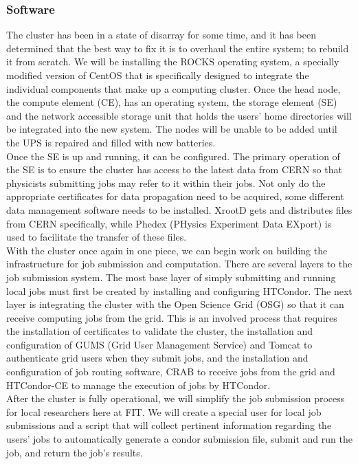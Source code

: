 \documentclass[12pt]{article}
\newcommand\tab[1][1cm]{\hspace*{#1}}
\begin{document}
\subsubsection*{Software}
%
\tab The cluster has been in a state of disarray for some time, and it has been determined that the best way to fix it is to overhaul the entire system; to rebuild it from scratch. We will be installing the ROCKS operating system, a specially modified version of CentOS that is specifically designed to integrate the individual components that make up a computing cluster. Once the head node, the compute element (CE), has an operating system, the storage element (SE) and the network accessible storage unit that holds the users’ home directories will be integrated into the new system. The nodes will be unable to be added until the UPS is repaired and filled with new batteries. \\
\tab Once the SE is up and running, it can be configured. The primary operation of the SE is to ensure the cluster has access to the latest data from CERN so that physicists submitting jobs may refer to it within their jobs. Not only do the appropriate certificates for data propagation need to be acquired, some different data management software needs to be installed. XrootD gets and distributes files from CERN specifically, while Phedex (PHysics Experiment Data EXport) is used to facilitate the transfer of these files. \\
\tab With the cluster once again in one piece, we can begin work on building the infrastructure for job submission and computation. There are several layers to the job submission system. The most base layer of simply submitting and running local jobs must first be created by installing and configuring HTCondor. The next layer is integrating the cluster with the Open Science Grid (OSG) so that it can receive computing jobs from the grid. This is an involved process that requires the installation of certificates to validate the cluster, the installation and configuration of GUMS (Grid User Management Service) and Tomcat to authenticate grid users when they submit jobs, and the installation and configuration of job routing software, CRAB to receive jobs from the grid and HTCondor-CE to manage the execution of jobs by HTCondor. \\
\tab After the cluster is fully operational, we will simplify the job submission process for local researchers here at FIT. We will create a special user for local job submissions and a script that will collect pertinent information regarding the users’ jobs to automatically generate a condor submission file, submit and run the job, and return the job’s results.
\end{document}
